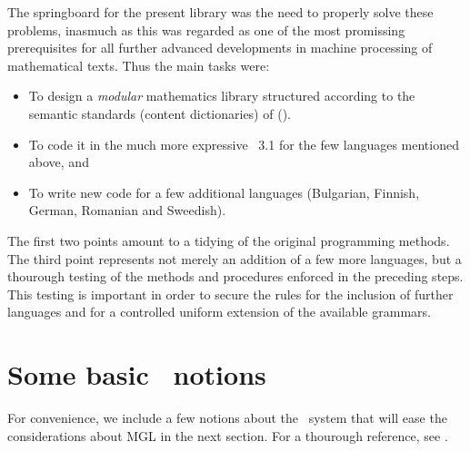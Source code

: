 \documentclass[adraft,copyright,creativecommons]{eptcs}
\begin{document}
The springboard for the present library was the need to properly solve
these problems, inasmuch as this was regarded as one of the most promissing
prerequisites for all further advanced developments in machine processing
of mathematical texts.  Thus the main tasks were:
\begin{itemize}
\item
To design a \emph{modular} mathematics library structured according to
the semantic standards (content dictionaries) of \openmath{}
(\cite{OpenMath}).
\item
To code it in the much more expressive \GF~3.1 for the few languages
mentioned above, and
\item
To write new code for a few additional languages (Bulgarian, Finnish,
German, Romanian and Sweedish).
\end{itemize}
The first two points amount to a tidying of the original \webalt{}
programming methods. The third point represents not merely an addition
of a few more languages, but a thourough testing of the methods and
procedures enforced in the preceding steps. This testing is important in
order to secure the rules for the inclusion of further languages and for
a controlled uniform extension of the available grammars.



\section{Some basic \GF\ notions}

For convenience, we include a few notions about the \GF\ 
system that will ease the considerations about MGL in the next section.
For a thourough reference, see \cite{Ranta11}.
\end{document}
